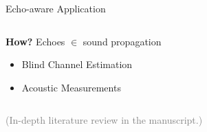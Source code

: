 \begin{frame}[t]{Echo-aware Application \hfill\faBook}
\begin{columns}[T,onlytextwidth]
        \begin{block}{\textbf{How?}}
            \small
            Echoes $\in$ sound propagation
            \begin{itemize}
                \item Blind Channel Estimation
                \\{\footnotesize\cite{lin2007blind,crocco2017uncalibrated}}
                \item Acoustic Measurements
                \\{\footnotesize\cite{eaton2015ace,kuttruff2016room}}
            \end{itemize}
        \end{block}
    \end{columns}


    \begin{center}
        \textcolor{gray}{\small (In-depth literature review in the manuscript.)}
    \end{center}
\end{frame}

